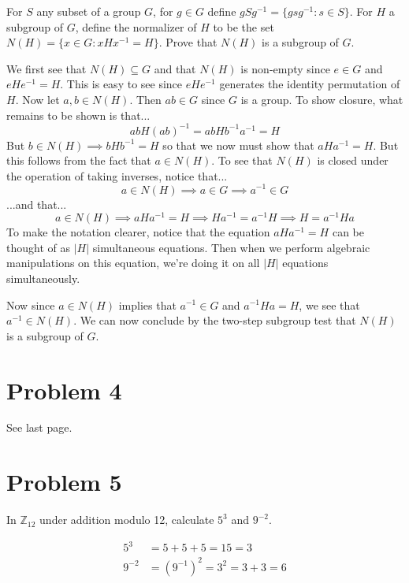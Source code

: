 \documentclass{article}
\begin{document}
For $S$ any subset of a group $G$, for $g\in G$ define $gSg^{-1}=\{gsg^{-1}:s\in S\}$.
For $H$ a subgroup of $G$, define the normalizer of $H$ to be the set
$N(H)=\{x\in G:xHx^{-1}=H\}$.  Prove that $N(H)$ is a subgroup of $G$.

We first see that $N(H)\subseteq G$ and that $N(H)$ is non-empty since
$e\in G$ and $eHe^{-1} = H$.  This is easy to see since $eHe^{-1}$
generates the identity permutation of $H$.
Now let $a,b\in N(H)$.  Then $ab\in G$ since $G$ is a group.  To show closure,
what remains to be shown is that...
\begin{equation*}
abH(ab)^{-1}=abHb^{-1}a^{-1}=H
\end{equation*}
But $b\in N(H)\implies bHb^{-1}=H$ so that we now must show that
$aHa^{-1}=H$.  But this follows from the fact that $a\in N(H)$.
To see that $N(H)$ is closed under the operation of taking inverses,
notice that...
\begin{equation*}
a\in N(H)\implies a\in G\implies a^{-1}\in G
\end{equation*}
...and that...
\begin{equation*}
a\in N(H)\implies aHa^{-1}=H\implies Ha^{-1}=a^{-1}H\implies H=a^{-1}Ha
\end{equation*}
To make the notation clearer, notice that the equation $aHa^{-1}=H$ can
be thought of as $|H|$ simultaneous equations.  Then when we perform algebraic
manipulations on this equation, we're doing it on all $|H|$ equations simultaneously.

Now since $a\in N(H)$ implies that $a^{-1}\in G$ and $a^{-1}Ha=H$, we see
that $a^{-1}\in N(H)$.
We can now conclude by the two-step subgroup test that $N(H)$ is a subgroup of $G$.

\section*{Problem 4}

See last page.

\section*{Problem 5}

In $\mathbb{Z}_{12}$ under addition modulo 12,
calculate $5^3$ and $9^{-2}$.

\begin{align*}
5^3 &= 5+5+5 = 15 = 3 \\
9^{-2} &= (9^{-1})^2 = 3^2 = 3+3 = 6
\end{align*}
\end{document}
